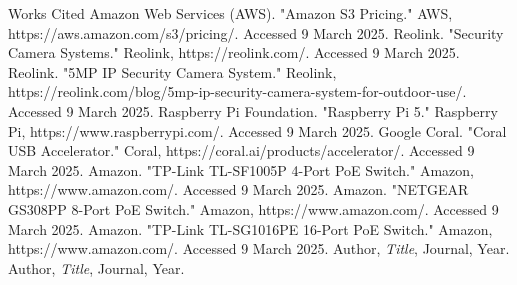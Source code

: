 \documentclass{report}
\begin{document}
\begin{thebibliography}{9}
    Works Cited
    Amazon Web Services (AWS). "Amazon S3 Pricing." AWS, https://aws.amazon.com/s3/pricing/. Accessed 9 March 2025.
    Reolink. "Security Camera Systems." Reolink, https://reolink.com/. Accessed 9 March 2025.
    Reolink. "5MP IP Security Camera System." Reolink, https://reolink.com/blog/5mp-ip-security-camera-system-for-outdoor-use/. Accessed 9 March 2025.
    Raspberry Pi Foundation. "Raspberry Pi 5." Raspberry Pi, https://www.raspberrypi.com/. Accessed 9 March 2025.
    Google Coral. "Coral USB Accelerator." Coral, https://coral.ai/products/accelerator/. Accessed 9 March 2025.
    Amazon. "TP-Link TL-SF1005P 4-Port PoE Switch." Amazon, https://www.amazon.com/. Accessed 9 March 2025.
    Amazon. "NETGEAR GS308PP 8-Port PoE Switch." Amazon, https://www.amazon.com/. Accessed 9 March 2025.
    Amazon. "TP-Link TL-SG1016PE 16-Port PoE Switch." Amazon, https://www.amazon.com/. Accessed 9 March 2025.
 Author, \textit{Title}, Journal, Year.
 Author, \textit{Title}, Journal, Year.
\end{thebibliography}
\end{document}

